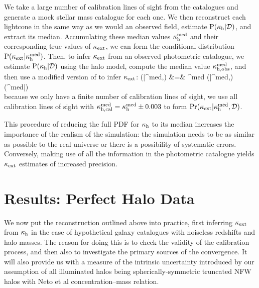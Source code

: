 \documentclass[useAMS,usenatbib,a4paper]{mn2e}
\begin{document}
We  take a large number of
calibration lines of sight from the \MS catalogues and generate a mock
stellar mass catalogue for each one. We then reconstruct each lightcone in the
same way as we would an observed field,
estimate ${\rm P}(\kappa_{\rm h}|{\mathcal{D}})$, and extract its median. Accumulating
these median values $\kappa_{\rm h}^{\rm med}$ and 
their corresponding true values of $\kappa_{\rm ext}$, we can form the 
conditional distribution ${\rm P}(\kappa_{\rm ext}|\kappa_{\rm h}^{\rm med})$. 
Then, to infer $\kappa_{\rm ext}$ from an observed photometric catalogue, we 
estimate ${\rm P}(\kappa_{\rm h}|{\mathcal{D}})$ 
using the halo model, compute the median value 
$\kappa_{\rm h,obs}^{\rm med}$, and then use a modified
version of 
 to infer $\kappa_{\rm ext}$: 
\bea
\Pr(\kappax|\kappah^{\rm med},\data) &=& \int \dee\kappah^{\rm med} 
   \Pr(\kappax|\kappah^{\rm med},\data) \Pr(\kappah^{\rm med}|\data) \notag \\
\label{eq:calkappaconv}   
\eea
{}
because we only have a finite number of calibration lines of sight, we use all
calibration lines of sight with $\kappa_{\rm h,cal}^{\rm med} =
\kappa_{\rm h}^{\rm med}\pm0.003$ to form $\Pr(\kappa_{\rm ext}|\kappa_{\rm h}^{\rm
med},{\mathcal{D}})$.

This procedure of reducing the full PDF for $\kappa_{\rm h}$ to its median increases
the importance of the realism of the simulation: the simulation needs to be as
similar as possible to the real universe or there is a possibility of
systematic errors. Conversely, making use of all the information
in the photometric catalogue yields $\kappa_{\rm ext}$ estimates of increased
precision.


\section{Results: Perfect Halo Data}
\label{sec:knownMh+z} 

We now put the reconstruction \proceedure outlined above into practice, first
inferring $\kappa_{\rm ext}$ from $\kappa_{\rm h}$ in the case of hypothetical galaxy
catalogues with noiseless redshifts and halo masses. The reason for doing this
is to check the validity of the calibration process, and then also to 
investigate the primary sources of the convergence. It will also provide us
with a measure of the intrinsic uncertainty introduced by our assumption of
all illuminated halos being spherically-symmetric truncated NFW halos with
Neto et al concentration--mass relation.
\end{document}
